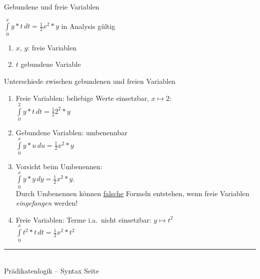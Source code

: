 \documentclass{slides}
\newcommand{\myrule}{\rule{20cm}{1mm}\\ }
\newcounter{mypage}
\begin{document}
\begin{slide}{}
\normalsize
\begin{center}
Gebundene und freie Variablen
\end{center}
\vspace{0.5cm}

\footnotesize
\hspace*{1.3cm} $\int\limits_{0}^{x} y * t\, d t = \frac{1}{2} x^2 * y$ \hspace*{1.3cm} in Analysis gültig
\begin{enumerate}
\item $x$, $y$: freie Variablen
\item $t$ gebundene Variable
\end{enumerate}

Unterschiede zwischen gebundenen und freien Variablen
\begin{enumerate}
\item Freie Variablen: beliebige Werte einsetzbar, $x \mapsto 2$: \\[0.3cm]
\hspace*{1.3cm}  $\int\limits_{0}^{2} y * t\, d t = \frac{1}{2} 2^2 * y$ 
\item Gebundene Variablen: umbenennbar \\[0.1cm]
\hspace*{1.3cm} $\int\limits_{0}^{x} y * u\, d u = \frac{1}{2} x^2 * y$ 
\item Vorsicht beim Umbenennen: \\[0.3cm]
\hspace*{1.3cm}  $\int\limits_{0}^{x} y * y\, d y = \frac{1}{2} x^2 * y$. \\[0.3cm]
      Durch Umbenennen können \underline{falsche} Formeln entstehen, wenn freie Variablen
      \emph{eingefangen} werden!  
\item Freie Variablen: Terme i.a.~nicht einsetzbar: $y \mapsto t^2$ \\[0.3cm]
\hspace*{1.3cm} $\int\limits_{0}^{x} t^2 * t\, d t = \frac{1}{2} x^2 * t^2$ \\[0.1cm]
\end{enumerate}


\vspace*{\fill}
\tiny \addtocounter{mypage}{1}
\myrule
Prädikatenlogik -- Syntax  \hspace*{\fill} Seite 
\end{slide}

\end{document}
